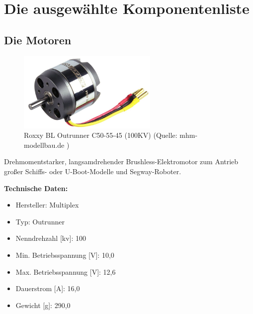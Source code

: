 \newpage
\renewcommand{\autoren}{Chepil Valentyn}
\section{Die ausgewählte Komponentenliste}
\subsection{Die Motoren}
\begin{figure}[!h]  %
	\centering\includegraphics[width=0.6\textwidth]{images/Motor.jpg}
	\caption{Roxxy BL Outrunner C50-55-45 (100KV) \newline (Quelle: mhm-modellbau.de )}
	\label{Motor Roxxy}
\end{figure}
Drehmomentstarker, langsamdrehender Brushless-Elektromotor zum Antrieb großer Schiffs- oder U-Boot-Modelle und Segway-Roboter.

\textbf{Technische Daten:} 
\begin{itemize} 
	\item Hersteller: Multiplex 
	\item Typ: Outrunner
	\item Nenndrehzahl [kv]: 100
	\item Min. Betriebsspannung [V]: 10,0
	\item Max. Betriebsspannung [V]: 12,6
	\item Dauerstrom [A]: 16,0
	\item Gewicht [g]: 290,0
\end{itemize}
\pagebreak
